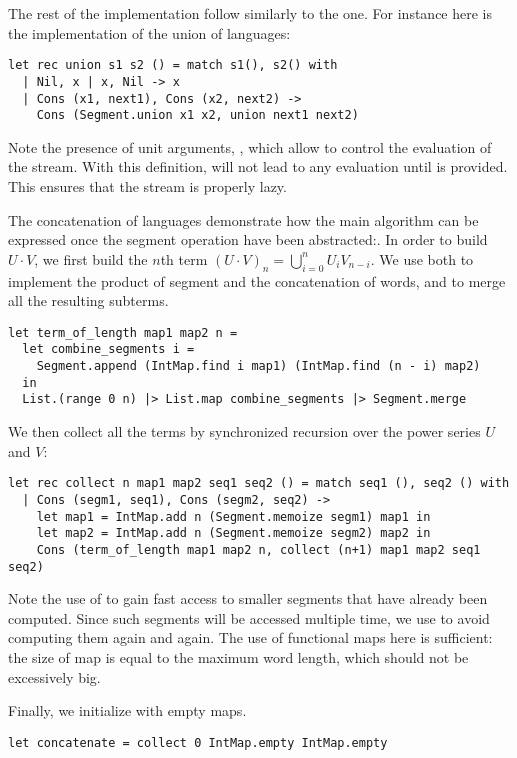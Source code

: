 The rest of the implementation follow similarly to the \haskell one. For instance
here is the implementation of the union of languages:
\begin{lstlisting}
let rec union s1 s2 () = match s1(), s2() with
  | Nil, x | x, Nil -> x
  | Cons (x1, next1), Cons (x2, next2) -> 
    Cons (Segment.union x1 x2, union next1 next2)
\end{lstlisting}
Note the presence of unit arguments, \code{()}, which allow to control the
evaluation of the stream. With this definition,  will not lead
to any evaluation until \code{()} is provided. This ensures that the stream is
properly lazy.

The concatenation of languages demonstrate how the main algorithm can
be expressed once the segment operation have been abstracted:.
In order to build $U \cdot V$, we first build the $n$th term
$(U \cdot V)_n = \bigcup_{i=0}^n U_i V_{n-i}$.
We use both  to implement the product
of segment and the concatenation of words, and  to merge
all the resulting subterms.
\begin{lstlisting}
let term_of_length map1 map2 n =
  let combine_segments i =
    Segment.append (IntMap.find i map1) (IntMap.find (n - i) map2)
  in
  List.(range 0 n) |> List.map combine_segments |> Segment.merge
\end{lstlisting}

We then collect all the terms by synchronized recursion over the power series $U$
and $V$:
\begin{lstlisting}
let rec collect n map1 map2 seq1 seq2 () = match seq1 (), seq2 () with
  | Cons (segm1, seq1), Cons (segm2, seq2) ->
    let map1 = IntMap.add n (Segment.memoize segm1) map1 in 
    let map2 = IntMap.add n (Segment.memoize segm2) map2 in
    Cons (term_of_length map1 map2 n, collect (n+1) map1 map2 seq1 seq2)
\end{lstlisting}

Note the use of  to gain fast access to smaller
segments that have already been computed. Since such segments will be accessed
multiple time, we use  to avoid computing them again and again.
The use of functional maps here is sufficient: the size of map is equal
to the maximum word length, which should not be excessively big.

Finally, we initialize  with empty maps.
\begin{lstlisting}[numbers=none]
let concatenate = collect 0 IntMap.empty IntMap.empty
\end{lstlisting}

